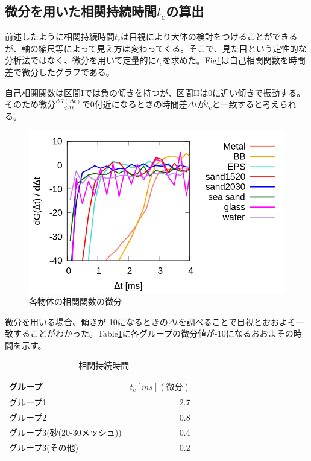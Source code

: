 \documentclass[a4j,12pt,dvipdfmx]{jsarticle}
\newcommand{\Dt}{\Delta t}
\newcommand{\II}{I\hspace{-.1em}I}
\begin{document}
\subsection{微分を用いた相関持続時間$t_c$の算出}
前述したように相関持続時間$t_c$は目視により大体の検討をつけることができるが、軸の縮尺等によって見え方は変わってくる。そこで、見た目という定性的な分析法ではなく、微分を用いて定量的に$t_c$を求めた。Fig\ref{fig:diff}は自己相関関数を時間差で微分したグラフである。 \par
自己相関関数は区間Iでは負の傾きを持つが、区間\II は0に近い傾きで振動する。そのため微分$\frac{dG(\Dt)}{d\Dt}$で0付近になるときの時間差$\Dt がt_c$と一致すると考えられる。
\begin{figure}[H]
	\includegraphics[scale=0.4]{diff.png}
	\caption{各物体の相関関数の微分}
	\label{fig:diff}
\end{figure}
微分を用いる場合、傾きが-10になるときの$\Dt$を調べることで目視とおおよそ一致することがわかった。Table\ref{tb:tc_diff}に各グループの微分値が-10になるおおよその時間を示す。
\begin{table}[H]
	\caption{相関持続時間 \label{tb:tc_diff}}
	\begin{tabular}{lrr}
		\toprule
		グループ & $t_c [ms](微分)$  \\
		\midrule
		グループ1 & 2.7  \\
		グループ2 & 0.8  \\
		グループ3(砂(20-30メッシュ)) & 0.4  \\
		グループ3(その他) & 0.2 \\
		\bottomrule
	\end{tabular}
\end{table}
\end{document}
